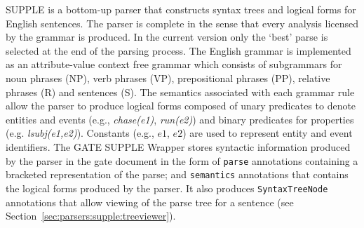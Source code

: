 % 
% 
% 
% 
% 
\label{sec:parsers:buchart}

SUPPLE is a bottom-up parser that constructs syntax trees and logical forms for
English sentences. The parser is complete in the sense that every analysis
licensed by the grammar is produced. In the current version only the `best'
parse is selected at the end of the parsing process. The English grammar is
implemented as an attribute-value context free grammar which consists of
subgrammars for noun phrases (NP), verb phrases (VP), prepositional phrases
(PP), relative phrases (R) and sentences (S). The semantics associated with each
grammar rule allow the parser to produce logical forms composed of unary
predicates to denote entities and events (e.g., {\em chase(e1)}, {\em run(e2)})
and binary predicates for properties (e.g. {\em lsubj(e1,e2)}). Constants (e.g.,
$e1$, $e2$) are used to represent entity and event identifiers. The GATE SUPPLE
Wrapper stores syntactic information produced by the parser in the gate document
in the form of \texttt{parse} annotations containing a bracketed
representation of the parse; and \texttt{semantics} annotations that contains
the logical forms produced by the parser.  It also produces
\texttt{SyntaxTreeNode} annotations that allow viewing of the parse tree for a
sentence (see Section~\ref{sec:parsers:supple:treeviewer}).

